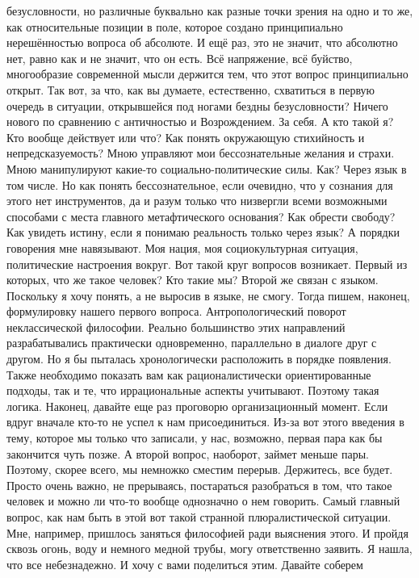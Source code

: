 безусловности, но различные буквально как разные точки зрения на одно и то же,
как относительные позиции в поле, которое создано принципиально нерешённостью
вопроса об абсолюте. И ещё раз, это не значит, что абсолютно нет, равно как и не
значит, что он есть. Всё напряжение, всё буйство, многообразие современной мысли
держится тем, что этот вопрос принципиально открыт. Так вот, за что, как вы
думаете, естественно, схватиться в первую очередь в ситуации, открывшейся под
ногами бездны безусловности? Ничего нового по сравнению с античностью и
Возрождением. За себя. А кто такой я? Кто вообще действует или что? Как понять
окружающую стихийность и непредсказуемость? Мною управляют мои бессознательные
желания и страхи. Мною манипулируют какие-то социально-политические силы. Как?
Через язык в том числе. Но как понять бессознательное, если очевидно, что у
сознания для этого нет инструментов, да и разум только что низвергли всеми
возможными способами с места главного метафтического основания? Как обрести
свободу? Как увидеть истину, если я понимаю реальность только через язык? А
порядки говорения мне навязывают. Моя нация, моя социокультурная ситуация,
политические настроения вокруг. Вот такой круг вопросов возникает. Первый из
которых, что же такое человек? Кто такие мы? Второй же связан с языком.
Поскольку я хочу понять, а не выросив в языке, не смогу. Тогда пишем, наконец,
формулировку нашего первого вопроса. Антропологический поворот неклассической
философии. Реально большинство этих направлений разрабатывались практически
одновременно, параллельно в диалоге друг с другом. Но я бы пыталась
хронологически расположить в порядке появления. Также необходимо показать вам
как рационалистически ориентированные подходы, так и те, что иррациональные
аспекты учитывают. Поэтому такая логика. Наконец, давайте еще раз проговорю
организационный момент. Если вдруг вначале кто-то не успел к нам присоединиться.
Из-за вот этого введения в тему, которое мы только что записали, у нас,
возможно, первая пара как бы закончится чуть позже. А второй вопрос, наоборот,
займет меньше пары. Поэтому, скорее всего, мы немножко сместим перерыв.
Держитесь, все будет. Просто очень важно, не прерываясь, постараться разобраться
в том, что такое человек и можно ли что-то вообще однозначно о нем говорить.
Самый главный вопрос, как нам быть в этой вот такой странной плюралистической
ситуации. Мне, например, пришлось заняться философией ради выяснения этого. И
пройдя сквозь огонь, воду и немного медной трубы, могу ответственно заявить. Я
нашла, что все небезнадежно. И хочу с вами поделиться этим. Давайте соберем
